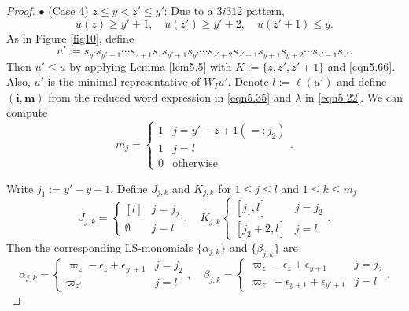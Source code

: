 \documentclass[12pt]{amsart}
\theoremstyle{definition}
\theoremstyle{remark}
\begin{document}
\begin{proof}
$\bullet$ (Case 4) $z \leq y < z' \leq y'$: Due to a $3i312$ pattern,
\begin{equation}\label{eqn5.66}
u(z) \geq y'+1, \quad u(z') \geq y'+2, \quad u(z'+1) \leq y.
\end{equation}
As in Figure \ref{fig10}, define
\begin{equation}\label{eqn5.35}
u':=s_{y'}s_{y'-1} \cdots s_{z+1} s_z s_{y'+1} s_{y'} \cdots s_{z'+2} s_{z'+1} s_{y+1} s_{y+2} \cdots s_{z'-1} s_{z'}.
\end{equation}
Then $u' \leq u$ by applying Lemma \ref{lem5.5} with $K:=\{z , z' , z'+1 \}$ and \eqref{eqn5.66}. Also, $u'$ is the minimal representative of $W_Iu'$. Denote $l:= \ell (u')$ and define $(\mathbf{i}, \mathbf{m})$ from the reduced word expression in \eqref{eqn5.35} and $\lambda$ in \eqref{eqn5.22}. We can compute
\begin{equation}\label{eqn5.36}
m_j = 
\begin{cases}
1 & j = y'-z+1 (=:j_2) \\
1 & j = l \\
0 & \text{otherwise}
\end{cases}
.
\end{equation}

Write $j_1:= y'-y+1$. Define $J_{j,k}$ and $K_{j,k}$ for $1\leq j \leq l$ and $1 \leq k \leq m_j$
\begin{equation}\label{eqn5.37}
J_{j,k} = 
\begin{cases}
[l] & j=j_2 \\
\emptyset & j = l
\end{cases}
, \quad K_{j,k}
\begin{cases}
[j_1,l] & j =j_2 \\
[j_2+2,l] & j =l
\end{cases}
.
\end{equation}
Then the corresponding LS-monomials $\{\alpha_{j,k}\}$ and $\{\beta_{j,k}\}$ are
\begin{equation}\label{eqn5.38}
\alpha_{j,k} = 
\begin{cases}
\varpi_{z}-\epsilon_z+\epsilon_{y'+1} & j = j_2 \\
\varpi_{z'} & j=l 
\end{cases}
, \quad \beta_{j,k}=
\begin{cases}
\varpi_{z}-\epsilon_{z} + \epsilon_{y+1} & j = j_2 \\
\varpi_{z'}-\epsilon_{y+1} + \epsilon_{y'+1} & j=l 
\end{cases}
.
\end{equation}


\end{proof}
\end{document}
